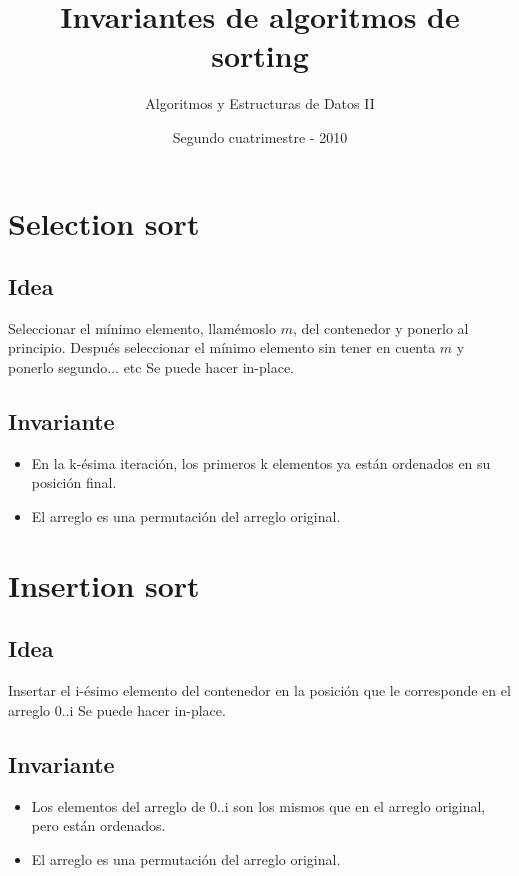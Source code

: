 \documentclass[a4paper]{article}
\title{Invariantes de algoritmos de sorting}
\author{Algoritmos y Estructuras de Datos II}
\date{Segundo cuatrimestre - 2010}
\begin{document}
\maketitle


\pagestyle{myheadings} \thispagestyle{plain}



\section{Selection sort}
\subsection{Idea}
    Seleccionar el mínimo elemento, llamémoslo $m$, del contenedor y ponerlo al principio. 
    Después seleccionar el mínimo elemento sin tener en cuenta $m$ y ponerlo segundo... etc
    Se puede hacer in-place.

\subsection{Invariante}
\begin{itemize}
    \item En la k-ésima iteración, los primeros k elementos ya están ordenados en su posición final.
    \item El arreglo es una permutación del arreglo original.
\end{itemize}

\section{Insertion sort}
\subsection{Idea}
    Insertar el i-ésimo elemento del contenedor en la posición que le corresponde en el arreglo 0..i
    Se puede hacer in-place.
\subsection{Invariante}
    \begin{itemize}
        \item Los elementos del arreglo de 0..i son los mismos que en el arreglo original, pero están ordenados.
        \item El arreglo es una permutación del arreglo original.
    \end{itemize}
\end{document}
